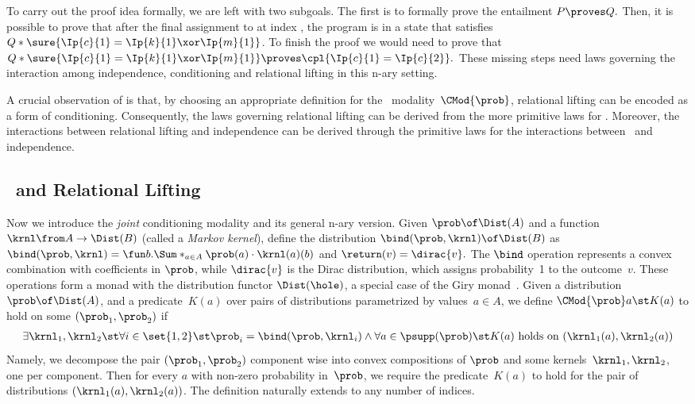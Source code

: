 To carry out the proof idea formally, we are left with two subgoals.
The first is to formally prove the entailment
$
  P \proves Q.
$
Then, it is possible to prove that after
the final assignment to  at index ,
the program is in a state that satisfies
$Q * \sure{\Ip{c}{1} = \Ip{k}{1} \xor \Ip{m}{1}}$.
To finish the proof we would need to prove that
$
  Q * \sure{\Ip{c}{1} = \Ip{k}{1} \xor \Ip{m}{1}}
  \proves
  \cpl{ \Ip{c}{1} = \Ip{c}{2} }.
$
These missing steps need laws
governing the interaction among independence, conditioning and relational lifting in this \pre n-ary setting.

\begin{result}
A crucial observation of \thelogic{}
is that, by choosing an appropriate definition for the
\supercond\ modality~$\CMod{\prob}$,
relational lifting can be encoded as a form of conditioning.
Consequently, the laws governing relational lifting can be derived
from the more primitive laws for \supercond.
Moreover, the interactions between relational lifting and independence can be derived through the primitive laws for the interactions between \supercond\ and independence.
\end{result}





\subsection{\SuperCond\ and Relational Lifting}
\label{sec:overview:supercond}

Now we introduce the \emph{joint} conditioning modality and its general \pre n-ary version.
Given
$\prob \of \Dist(A)$ and
a function $\krnl \from A \to \Dist(B)$ (called a \emph{Markov kernel}),
define the distribution $\bind(\prob, \krnl) \of \Dist(B)$ as
$
  \bind(\prob, \krnl) =
    \fun b.\Sum*_{a\in A} \prob(a) \cdot \krnl(a)(b)
$ and $
  \return(v) = \dirac{v}.
$
The $\bind$ operation represents a convex combination with coefficients in
$\prob$, while $\dirac{v}$ is the Dirac distribution, which assigns probability~1
to the outcome~$v$.
These operations form a monad with the distribution functor $\Dist(\hole)$,
a special case of the Giry monad~\cite{giry1982categorical}.
Given a distribution $\prob \of \Dist(A)$,
and a predicate~$K(a)$ over pairs of distributions
parametrized by values~$a\in A$,
we define
$
  \CMod{\prob} a\st K(a)
$
to hold on some $(\prob_1,\prob_2)$ if
\begin{align*}
  \exists \krnl_1,\krnl_2 \st
  \forall i \in \set{1,2} \st
    \prob_i = \bind(\prob, \krnl_i)
  \land
  \forall a \in \psupp(\prob) \st
    K(a) \text{ holds on }
    (\krnl_1(a), \krnl_2(a))
\end{align*}
Namely, we decompose the pair $(\prob_1,\prob_2)$ component wise
into convex compositions of $\prob$ and some kernels~$\krnl_1,\krnl_2$,
one per component.
Then for every $a$ with non-zero probability in~$\prob$, we require the predicate~$K(a)$ to hold for the pair of distributions
$ (\krnl_1(a), \krnl_2(a)) $.
The definition naturally extends to any number of indices.


